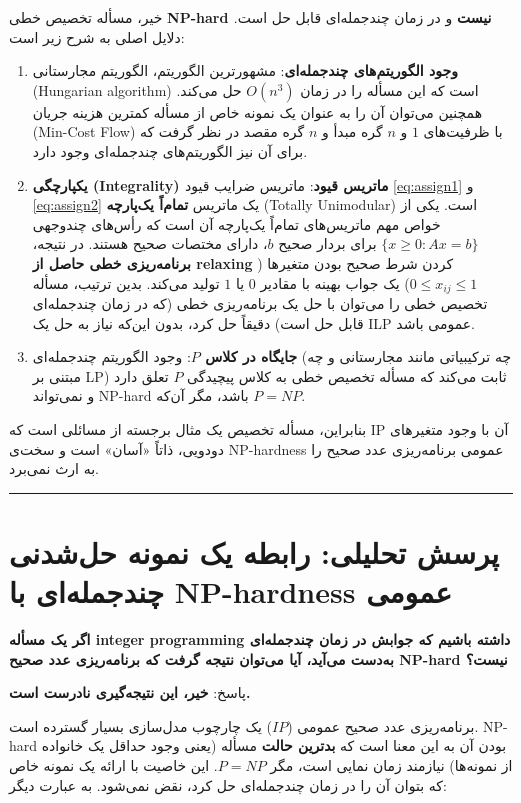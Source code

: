 \documentclass[11pt,a4paper]{article}
\newcommand{\en}[1]{\textenglish{#1}}
\newcommand{\separator}{\vspace{1em}\noindent\rule{\linewidth}{0.4pt}\vspace{1em}}
\begin{document}
خیر، مسأله تخصیص خطی \textbf{\en{NP-hard} نیست} و در زمان چندجمله‌ای قابل حل است. دلایل اصلی به شرح زیر است:

\begin{enumerate}
\item \textbf{وجود الگوریتم‌های چندجمله‌ای}: مشهورترین الگوریتم، الگوریتم مجارستانی (\en{Hungarian algorithm}) است که این مسأله را در زمان $O(n^3)$ حل می‌کند. همچنین می‌توان آن را به عنوان یک نمونه خاص از مسأله کمترین هزینه جریان (\en{Min-Cost Flow}) با ظرفیت‌های $1$ و $n$ گره مبدأ و $n$ گره مقصد در نظر گرفت که برای آن نیز الگوریتم‌های چندجمله‌ای وجود دارد.

\item \textbf{یکپارچگی (\en{Integrality}) ماتریس قیود}: ماتریس ضرایب قیود \eqref{eq:assign1} و \eqref{eq:assign2} یک ماتریس \textbf{تمام‌اً یک‌پارچه} (\en{Totally Unimodular}) است. یکی از خواص مهم ماتریس‌های تمام‌اً یک‌پارچه آن است که رأس‌های چندوجهی $\{x \ge 0 : Ax = b\}$ برای بردار صحیح $b$، دارای مختصات صحیح هستند. در نتیجه، \textbf{برنامه‌ریزی خطی حاصل از relaxing} کردن شرط صحیح بودن متغیرها ($0 \le x_{ij} \le 1$) یک جواب بهینه با مقادیر $0$ یا $1$ تولید می‌کند. بدین ترتیب، مسأله تخصیص خطی را می‌توان با حل یک برنامه‌ریزی خطی (که در زمان چندجمله‌ای قابل حل است) دقیقاً حل کرد، بدون این‌که نیاز به حل یک \en{ILP} عمومی باشد.

\item \textbf{جایگاه در کلاس $P$}: وجود الگوریتم چندجمله‌ای (چه ترکیبیاتی مانند مجارستانی و چه مبتنی بر \en{LP}) ثابت می‌کند که مسأله تخصیص خطی به کلاس پیچیدگی $P$ تعلق دارد و نمی‌تواند \en{NP-hard} باشد، مگر آن‌که $P = NP$.
\end{enumerate}

بنابراین، مسأله تخصیص یک مثال برجسته از مسائلی است که \en{IP} آن با وجود متغیرهای دودویی، ذاتاً «آسان» است و سخت‌ی \en{NP-hardness} عمومی برنامه‌ریزی عدد صحیح را به ارث نمی‌برد.

\separator
\newpage
\section{پرسش تحلیلی: رابطه یک نمونه حل‌شدنی چندجمله‌ای با \en{NP-hardness} عمومی}

\textbf{اگر یک مسأله \en{integer programming} داشته باشیم که جوابش در زمان چندجمله‌ای به‌دست می‌آید، آیا می‌توان نتیجه گرفت که برنامه‌ریزی عدد صحیح \en{NP-hard} نیست؟}

پاسخ: \textbf{خیر، این نتیجه‌گیری نادرست است.} 

برنامه‌ریزی عدد صحیح عمومی ($IP$) یک چارچوب مدل‌سازی بسیار گسترده است. \en{NP-hard} بودن آن به این معنا است که \textbf{بدترین حالت} مسأله (یعنی وجود حداقل یک خانواده از نمونه‌ها) نیازمند زمان نمایی است، مگر $P=NP$. این خاصیت با ارائه یک نمونه خاص که بتوان آن را در زمان چندجمله‌ای حل کرد، نقض نمی‌شود. به عبارت دیگر:
\end{document}
